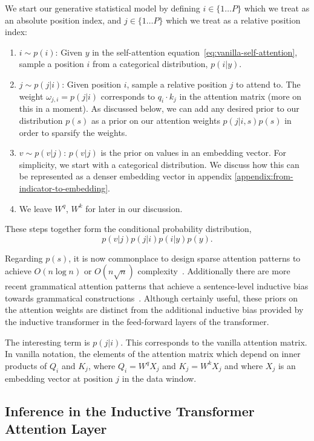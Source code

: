\documentclass{article}
\begin{document}
We start our generative statistical model by defining $i \in \{1 \ldots P\}$ which we treat as an absolute position index, and $j \in \{1 \ldots P\}$ which we treat as a relative position index:
\begin{enumerate}
    \item $i \sim p(i)$: Given $y$ in the self-attention equation~\ref{eq:vanilla-self-attention}, sample a position $i$ from a categorical distribution, $p(i|y)$.
    \item $j \sim p(j|i)$: Given position $i$, sample a relative position $j$ to attend to. The weight $\omega_{j,i} = p(j|i)$ corresponds to $q_i \cdot k_j$ in the attention matrix (more on this in a moment).  As discussed below, we can add any desired prior to our distribution $p(s)$ as a prior on our attention weights $p(j|i, s)p(s)$ in order to sparsify the weights.
    \item $v \sim p(v|j)$: $p(v|j)$ is the prior on values in an embedding vector.  For simplicity, we start with a categorical distribution.  We discuss how this can be represented as a denser embedding vector in appendix \ref{appendix:from-indicator-to-embedding}.
    \item We leave $W^q$, $W^k$ for later in our discussion.
\end{enumerate}
These steps together form the conditional probability distribution,
\begin{equation}
    p(v|j)p(j|i)p(i|y)p(y). \label{eq:prob-position-generate}
\end{equation}

Regarding $p(s)$, it is now commonplace to design sparse attention patterns to achieve $O(n \log n)$ or $O(n \sqrt{n})$ complexity~\citep{DBLP:journals/corr/abs-2009-06732, DBLP:journals/corr/abs-2007-14062}.  Additionally there are more recent grammatical attention patterns that achieve a sentence-level inductive bias towards grammatical constructions~\citep{sartran2022transformer}. Although certainly useful, these priors on the attention weights are distinct from the additional inductive bias provided by the inductive transformer in the feed-forward layers of the transformer. 

The interesting term is $p(j|i)$.  This corresponds to the vanilla attention matrix.  In vanilla notation, the elements of the attention matrix which depend on inner products of $Q_i$ and $K_j$, where $Q_i = W^q X_j$ and $K_j = W^k X_j$ and where $X_j$ is an embedding vector at position $j$ in the data window. 

\subsection{Inference in the Inductive Transformer Attention Layer}
\end{document}
